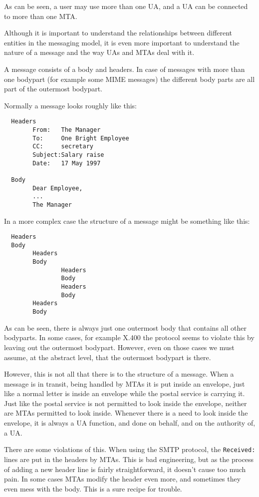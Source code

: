 As can be seen, a user may use more than one UA, and a UA can be connected 
to more than one MTA.

Although it is important to understand the relationships between different 
entities in the messaging model, it is even more important to understand the 
nature of a message and the way UAs and MTAs deal with it.

A message consists of a body and headers. In case of messages with more 
than one bodypart (for example some MIME messages) the different body 
parts are all part of the outermost bodypart.

Normally a message looks roughly like this:
\begin{verbatim}
  Headers
        From:   The Manager
        To:     One Bright Employee
        CC:     secretary
        Subject:Salary raise
        Date:   17 May 1997

  Body
        Dear Employee,
        ...
        The Manager
\end{verbatim}

In a more complex case the structure of a message might be something like this:
\begin{verbatim}
  Headers
  Body
        Headers
        Body
                Headers
                Body
                Headers
                Body
        Headers
        Body
\end{verbatim}

As can be seen, there is always just one outermost body that contains 
all other bodyparts. In some cases, for example X.400 the protocol 
seems to violate this by leaving out the outermost bodypart. However, 
even on those cases we must assume, at the abstract level, 
that the outermost bodypart is there.

However, this is not all that there is to the structure of a message. 
When a message is in transit, being handled by MTAs it is put inside 
an envelope, just like a normal letter is inside an envelope while 
the postal service is carrying it. Just like the postal service is not 
permitted to look inside the envelope, neither are MTAs permitted 
to look inside. Whenever there is a need to look inside the envelope, 
it is always a UA function, and done on behalf, and on the authority of, a UA.

There are some violations of this. When using the SMTP protocol, the 
{\tt Received:} lines are put in the headers by MTAs. This is bad 
engineering, but as the process of adding a new header line is fairly 
straightforward, it doesn't cause too much pain. In some cases MTAs 
modify the header even more, and sometimes they even mess with the body. 
This is a sure recipe for trouble.



